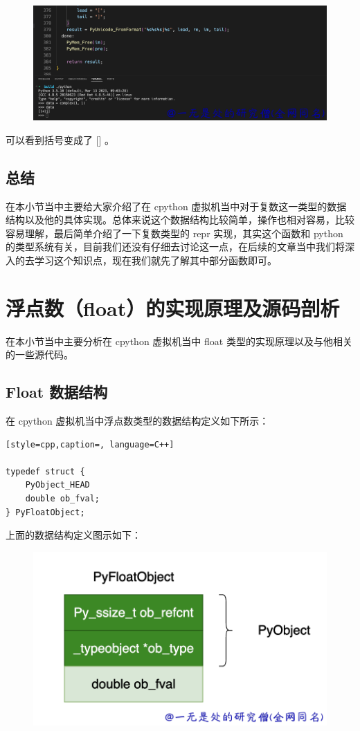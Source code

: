     \begin{figure}[H]
        \centering
            \includegraphics[scale=.3]{images/24-int.png}
            \caption{ }
        \label{fig:my_label}
    \end{figure}
    
可以看到括号变成了 [] 。
\subsection{总结}
在本小节当中主要给大家介绍了在 cpython 虚拟机当中对于复数这一类型的数据结构以及他的具体实现。总体来说这个数据结构比较简单，操作也相对容易，比较容易理解，最后简单介绍了一下复数类型的 repr 实现，其实这个函数和 python 的类型系统有关，目前我们还没有仔细去讨论这一点，在后续的文章当中我们将深入的去学习这个知识点，现在我们就先了解其中部分函数即可。
\section{浮点数（float）的实现原理及源码剖析}
在本小节当中主要分析在 cpython 虚拟机当中 float 类型的实现原理以及与他相关的一些源代码。
\subsection{Float 数据结构}
在 cpython 虚拟机当中浮点数类型的数据结构定义如下所示：
\begin{lstlisting}[style=cpp,caption=, language=C++]

typedef struct {
    PyObject_HEAD
    double ob_fval;
} PyFloatObject;
\end{lstlisting}
上面的数据结构定义图示如下：

    \begin{figure}[H]
        \centering
            \includegraphics[scale=.4]{images/12-tuple.png}
            \caption{ }
        \label{fig:my_label}
    \end{figure}
    

